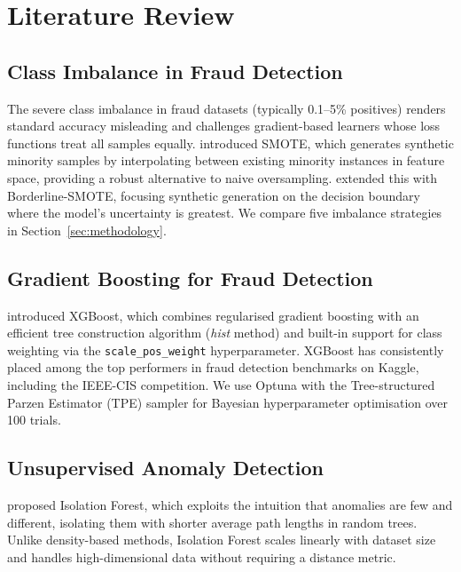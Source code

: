 ﻿%

\section{Literature Review}
\label{sec:litreview}

\subsection{Class Imbalance in Fraud Detection}

The severe class imbalance in fraud datasets (typically 0.1--5\% positives)
renders standard accuracy misleading and challenges gradient-based learners
whose loss functions treat all samples equally.
\citet{chawla2002smote} introduced SMOTE, which generates synthetic minority
samples by interpolating between existing minority instances in feature space,
providing a robust alternative to naive oversampling.
\citet{han2005borderline} extended this with Borderline-SMOTE, focusing
synthetic generation on the decision boundary where the model's uncertainty
is greatest.
We compare five imbalance strategies in Section~\ref{sec:methodology}.

\subsection{Gradient Boosting for Fraud Detection}

\citet{chen2016xgboost} introduced XGBoost, which combines regularised
gradient boosting with an efficient tree construction algorithm (\textit{hist}
method) and built-in support for class weighting via the
\texttt{scale\_pos\_weight} hyperparameter.
XGBoost has consistently placed among the top performers in fraud detection
benchmarks on Kaggle, including the IEEE-CIS competition.
We use Optuna \citep{akiba2019optuna} with the Tree-structured Parzen Estimator
(TPE) sampler for Bayesian hyperparameter optimisation over 100 trials.

\subsection{Unsupervised Anomaly Detection}

\citet{liu2008isolation} proposed Isolation Forest, which exploits the
intuition that anomalies are few and different, isolating them with
shorter average path lengths in random trees.
Unlike density-based methods, Isolation Forest scales linearly with dataset
size and handles high-dimensional data without requiring a distance metric.

